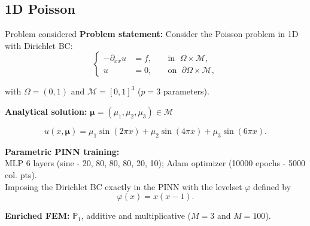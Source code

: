 
\subsection{1D Poisson}

\begin{frame}{Problem considered}
	\textbf{Problem statement:} Consider the Poisson problem in 1D with Dirichlet BC:
	\vspace{-5pt}
	\begin{equation*}
		\left\{
		\begin{aligned}
			-\partial_{xx} u & = f, \; &  & \text{in } \; \Omega \times \mathcal{M},         \\
			u                & =0, \;  &  & \text{on } \; \partial\Omega \times \mathcal{M},
		\end{aligned}
		\right.
	\end{equation*}

	\vspace{-5pt}
	with $\Omega=(0,1)$ and $\mathcal{M}=[0,1]^3$ ($p=3$ parameters).

	\vspace{8pt}
	\textbf{Analytical solution:} $\bm{\mu}=(\mu_1,\mu_2,\mu_3) \in \mathcal{M}$

	\vspace{-5pt}
	\begin{equation*}
		u(x,\bm{\mu})=\mu_1\sin(2\pi x)+\mu_2\sin(4\pi x)+\mu_3\sin(6\pi x).
	\end{equation*}

	\vspace{10pt}
	\textbf{Parametric PINN training:} \\
	MLP 6 layers (sine - 20, 80, 80, 80, 20, 10); Adam optimizer (10000 epochs - 5000 col. pts). \\
	Imposing the Dirichlet BC exactly in the PINN with the levelset $\varphi$ defined by
	\vspace{-8pt}
	$$\varphi(x)=x(x-1).$$

	\vspace{-4pt}
	\textbf{Enriched FEM:} $\mathbb{P}_1$, additive and multiplicative ($M=3$ and $M=100$).
\end{frame}

